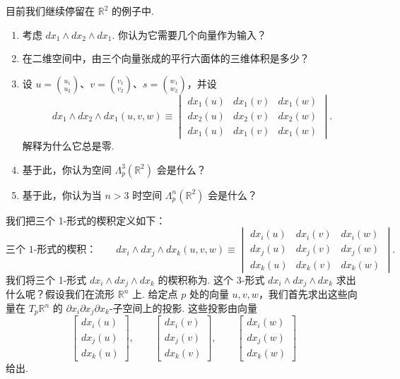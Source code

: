 \begin{question}\label{q:3-2}
目前我们继续停留在 $\mathbb{R}^2$ 的例子中.
\begin{enumerate}
  \item[(a)] 考虑 $dx_1\wedge dx_2\wedge dx_1$. 你认为它需要几个向量作为输入？
  \item[(b)] 在二维空间中，由三个向量张成的平行六面体的三维体积是多少？
  \item[(c)] 设 $u=\binom{u_1}{u_2}$、$v=\binom{v_1}{v_2}$、$s=\binom{w_1}{w_2}$，并设
  \[
  dx_1\wedge dx_2\wedge dx_1(u,v,w)\equiv
  \begin{vmatrix}
  dx_1(u) & dx_1(v) & dx_1(w)\\
  dx_2(u) & dx_2(v) & dx_2(w)\\
  dx_1(u) & dx_1(v) & dx_1(w)
  \end{vmatrix}.
  \]
  解释为什么它总是零.
  \item[(d)] 基于此，你认为空间 $\Lambda_p^3(\mathbb{R}^2)$ 会是什么？
  \item[(e)] 基于此，你认为当 $n>3$ 时空间 $\Lambda_p^n(\mathbb{R}^2)$ 会是什么？
\end{enumerate}
\end{question}

我们把三个 1-形式的楔积定义如下：
\[
\text{三个 1-形式的楔积：}\qquad
dx_i\wedge dx_j\wedge dx_k(u,v,w)\equiv
\begin{vmatrix}
dx_i(u) & dx_i(v) & dx_i(w)\\
dx_j(u) & dx_j(v) & dx_j(w)\\
dx_k(u) & dx_k(v) & dx_k(w)
\end{vmatrix}.
\]
我们将三个 1-形式 $dx_i\wedge dx_j\wedge dx_k$ 的楔积称为. 这个 3-形式 $dx_i\wedge dx_j\wedge dx_k$ 求出什么呢？假设我们在流形 $\mathbb{R}^n$ 上. 给定点 $p$ 处的向量 $u,v,w$，我们首先求出这些向量在 $T_p\mathbb{R}^n$ 的 $\partial x_i\partial x_j\partial x_k$-子空间上的投影. 这些投影由向量
\[
\begin{bmatrix}dx_i(u)\\dx_j(u)\\dx_k(u)\end{bmatrix},\qquad
\begin{bmatrix}dx_i(v)\\dx_j(v)\\dx_k(v)\end{bmatrix},\qquad
\begin{bmatrix}dx_i(w)\\dx_j(w)\\dx_k(w)\end{bmatrix}
\]
给出.

